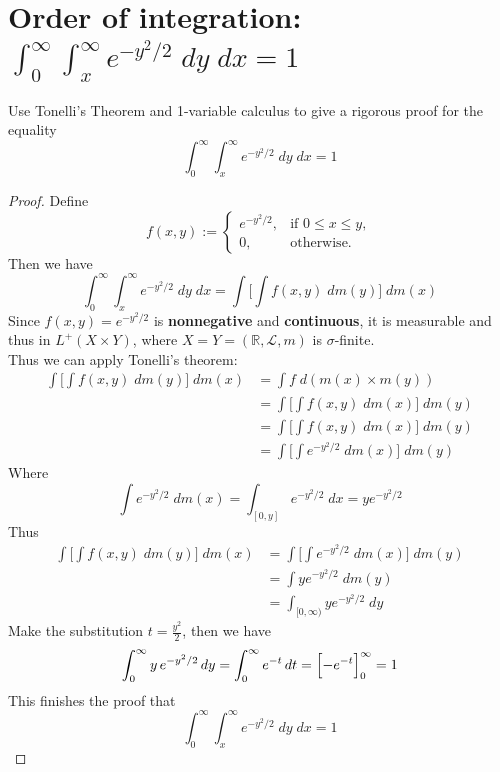 \documentclass[lang=cn,11pt]{elegantbook}
\begin{document}
\section{Order of integration: $ \int_0^\infty\int_x^\infty e^{-y^2/2}\;d y \;d x=1$}
  Use Tonelli's Theorem and 1-variable calculus to give a rigorous proof for the equality
  \[
    \int_0^\infty\int_x^\infty e^{-y^2/2}\;d y \;d x=1
  \]
\begin{proof}
 Define \[
 f(x,y) := \begin{cases}
   e^{-y^2/2}, & \text{if } 0 \le x \le y,\\
   0, & \text{otherwise}.
   \end{cases}
 \] Then we have \[
     \int_0^\infty\int_x^\infty e^{-y^2/2}\;d y \;d x=   \int \Big[   \int f(x,y) \; d m(y)  \Big]  \; dm(x) 
 \]
 Since $ f (x,y) = e^{-y^2/2}$ is \textbf{nonnegative} and \textbf{continuous}, it is measurable and thus in $L^+(X \times Y)$, where $X = Y = (\mathbb{R},\mathcal{L}, m)$ is $\sigma$-finite.\\
    Thus we can apply Tonelli's theorem: \begin{align}
      \int \Big[   \int f(x,y) \; d m(y)  \Big]  \; dm(x) &= \int f \; d(m(x)  \times m(y))     \\
& =    \int \Big[   \int f(x,y) \; d m(x)  \Big]  \; dm(y) \\
& =  \int \Big[   \int f(x,y) \; d m(x)  \Big]  \; dm(y) \\
& = \int \Big[   \int e^{-y^2/2} \; d m(x)  \Big]  \; dm(y) 
    \end{align}Where\[
     \int e^{-y^2/2} \; d m(x)   = \int_{[0,y]} e^{-y^2/2} \; dx =  ye^{-y^2/2}
    \]
Thus  \begin{align}
      \int \Big[   \int f(x,y) \; d m(y)  \Big]  \; dm(x) &=\int \Big[   \int e^{-y^2/2} \; d m(x)  \Big]  \; dm(y) \\
      &= \int ye^{-y^2/2} \; dm(y) \\
      & = \int_{[0,\infty)} ye^{-y^2/2} \; dy 
\end{align}
Make the substitution \(t = \frac{y^2}{2}\), then we have
\[
\int_0^\infty y\, e^{-y^2/2}\,dy =
\int_0^\infty e^{-t}\,dt =
\Bigl[ - e^{-t} \Bigr]_{0}^{\infty} = 1
\]
This finishes the proof that \[
 \int_0^\infty\int_x^\infty e^{-y^2/2}\;d y \;d x = 1
\]
\end{proof}
\end{document}
